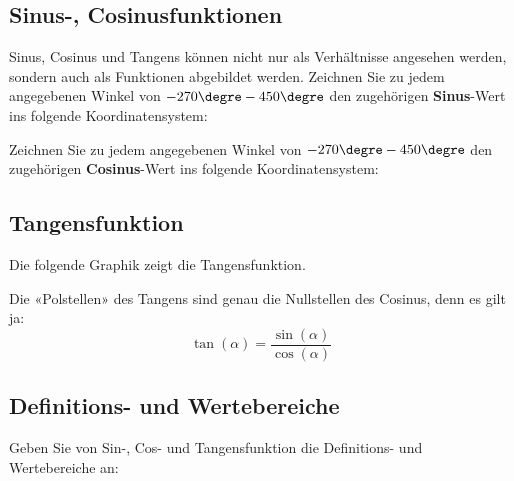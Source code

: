 \subsection{Sinus-, Cosinusfunktionen}
Sinus, Cosinus und Tangens können nicht nur als Verhältnisse angesehen
werden, sondern auch als Funktionen abgebildet werden.
Zeichnen Sie zu jedem angegebenen Winkel von $-270\degre - 450\degre$ den zugehörigen
\textbf{Sinus}-Wert ins folgende Koordinatensystem:

\noTRAINER{\trigsysD}\TRAINER{\trigsysDsin}



Zeichnen Sie zu jedem angegebenen Winkel von $-270\degre - 450\degre$ den zugehörigen
\textbf{Cosinus}-Wert ins folgende Koordinatensystem:

\noTRAINER{\trigsysD}\TRAINER{\trigsysDcos}

\newpage

\subsection{Tangensfunktion}
Die folgende Graphik zeigt die Tangensfunktion.




\begin{bemerkung}{}{}
  Die «Polstellen» des Tangens sind genau die Nullstellen des Cosinus, denn es gilt ja:
  $$\tan(\alpha) = \frac{\sin(\alpha)}{\cos(\alpha)}$$
\end{bemerkung}

\newpage

\subsection{Definitions- und Wertebereiche}

Geben Sie von Sin-, Cos- und Tangensfunktion die Definitions- und
Wertebereiche an:

